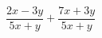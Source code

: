 \begin{ex}
	\begin{condition}
		\( \dfrac{2x-3y}{5x+y}+\dfrac{7x+3y}{5x+y} \)
	\end{condition}
\end{ex}